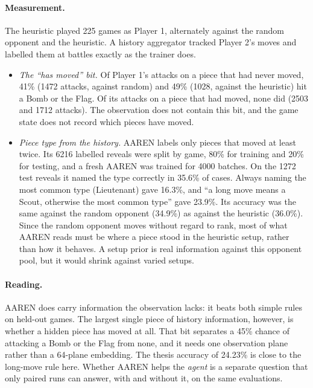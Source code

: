 \paragraph{Measurement.} The heuristic played 225 games as Player 1, alternately against the random
opponent and the heuristic. A history aggregator tracked Player 2's moves and labelled them at
battles exactly as the trainer does.
\begin{itemize}
  \item \emph{The ``has moved'' bit.} Of Player 1's attacks on a piece that had never moved,
        41\% (1472 attacks, against random) and 49\% (1028, against the heuristic) hit a Bomb
        or the Flag. Of its attacks on a piece that had moved, none did (2503 and 1712 attacks).
        The observation does not contain this bit, and the game state does not record which
        pieces have moved.
  \item \emph{Piece type from the history.} AAREN labels only pieces that moved at least twice.
        Its 6216 labelled reveals were split by game, 80\% for training and 20\% for testing,
        and a fresh AAREN was trained for 4000 batches. On the 1272 test reveals it named the
        type correctly in 35.6\% of cases. Always naming the most common type (Lieutenant) gave
        16.3\%, and ``a long move means a Scout, otherwise the most common type'' gave 23.9\%.
        Its accuracy was the same against the random opponent (34.9\%) as against the
        heuristic (36.0\%). Since the random opponent moves without regard to rank, most of
        what AAREN reads must be where a piece stood in the heuristic setup, rather than how it
        behaves. A setup prior is real information against this opponent pool, but it would
        shrink against varied setups.
\end{itemize}

\paragraph{Reading.} AAREN does carry information the observation lacks: it beats both simple rules
on held-out games. The largest single piece of history information, however, is whether a hidden
piece has moved at all. That bit separates a 45\% chance of attacking a Bomb or the Flag from
none, and it needs one observation plane rather than a 64-plane embedding. The thesis accuracy
of 24.23\% is close to the long-move rule here. Whether AAREN helps the \emph{agent} is a separate
question that only paired runs can answer, with and without it, on the same evaluations.

